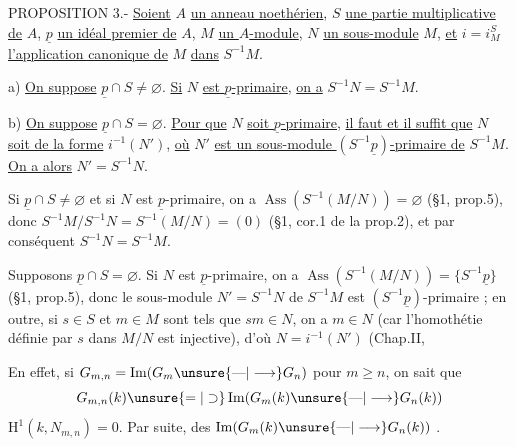 PROPOSITION 3.- \uline{Soient} $A$ \uline{un anneau noethérien}, $S$ \uline{une partie multiplicative de} $A$, $\underline p$ \uline{un idéal premier de} $A$, $M$ \uline{un $A$-module}, $N$ \uline{un sous-module} $M$, \uline{et} $i=i_M^S$ \uline{l'application canonique de} $M$ \uline{dans} $S^{-1}M$.


a) \uline{On suppose} $\underline p\cap S\neq\varnothing$. \uline{Si} $N$ \uline{est $\underline p$-primaire}, \uline{on a} $S^{-1}N=S^{-1}M$.

b) \uline{On suppose} $\underline p\cap S=\varnothing$. \uline{Pour que} $N$ \uline{soit $\underline p$-primaire}, \uline{il faut et il suffit que} $N$ \uline{soit de la forme} $i^{-1}(N')$, \uline{où} $N'$ \uline{est un sous-module $(S^{-1}\underline p)$-primaire de} $S^{-1}M$. \uline{On a alors} $N'=S^{-1}N$.

Si $\underline p\cap S\neq\varnothing$ et si $N$ est $\underline p$-primaire, on a $\operatorname{Ass}(S^{-1}(M/N))=\varnothing$ (§1, prop.5), donc $S^{-1}M/S^{-1}N=S^{-1}(M/N)=(0)$ (§1, cor.1 de la prop.2), et par conséquent $S^{-1}N=S^{-1}M$.

Supposons $\underline p\cap S=\varnothing$. Si $N$ est $\underline p$-primaire, on a $\operatorname{Ass}(S^{-1}(M/N))=\{S^{-1}\underline p\}$ (§1, prop.5), donc le sous-module $N'=S^{-1}N$ de $S^{-1}M$ est $(S^{-1}\underline p)$-primaire ; en outre, si $s\in S$ et $m\in M$ sont tels que $sm\in N$, on a $m\in N$ (car l'homothétie définie par $s$ dans $M/N$ est injective), d'où $N=i^{-1}(N')$ (Chap.II,





En effet, si $G_{m,n}=\operatorname{Im}(G_m\unsure{\text{---}|\longrightarrow}G_n)$ pour $m\geq n$, on sait que
\[
G_{m,n}(k)\unsure{=|\supset}\operatorname{Im}(G_m(k)\unsure{\text{---}|\longrightarrow}G_n(k))
\]
 $\mathrm H^1(k,N_{m,n})=0$. Par suite,   des $\operatorname{Im}(G_m(k)\unsure{\text{---}|\longrightarrow}G_n(k))$  .

